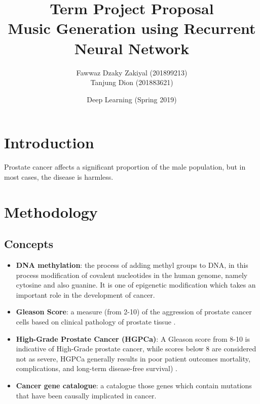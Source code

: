 \documentclass[a4paper,oneside]{article}
\begin{document}
\title{\vspace{-0.7in}Term Project Proposal\\\textbf{Music Generation using Recurrent Neural Network}}
\author{Fawwaz Dzaky Zakiyal (201899213)\\Tanjung Dion (201883621)\\}
\date{Deep Learning (Spring 2019)}
\maketitle
 
\section{Introduction}
Prostate cancer affects a significant proportion of the male population, but in most cases, the disease is harmless.


\section{Methodology}
\subsection{Concepts}
\begin{itemize}
\item \textbf{DNA methylation}: the process of adding methyl groups to DNA, in this process modification of covalent nucleotides in the human genome, namely cytosine and also guanine. It is one of epigenetic modification which takes an important role in the development of cancer.
\item \textbf{Gleason Score}: a measure (from 2-10) of the aggression of prostate cancer cells based on clinical pathology of prostate tissue \cite{prostate}.
\item \textbf{High-Grade Prostate Cancer (HGPCa)}: A Gleason score from 8-10 is indicative of High-Grade prostate cancer, while scores below 8 are considered not as severe, HGPCa generally results in poor patient outcomes mortality, complications, and long-term disease-free survival) \cite{prostate}.
\item \textbf{Cancer gene catalogue}: a catalogue those genes which contain mutations that have been causally implicated in cancer.
\end{itemize}
\end{document}
